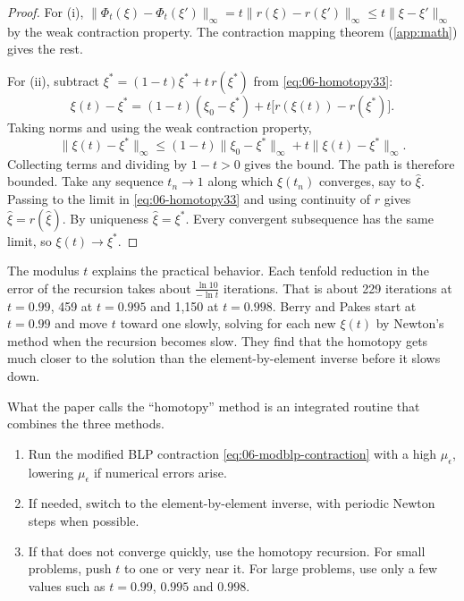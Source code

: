 \begin{proof}
For (i), $\lVert \Phi_t(\xi) - \Phi_t(\xi') \rVert_\infty = t \lVert r(\xi) - r(\xi') \rVert_\infty \le t \lVert \xi - \xi'
\rVert_\infty$ by the weak contraction property. The contraction mapping theorem (\cref{app:math}) gives the rest.

For (ii), subtract $\xi^* = (1 - t)\xi^* + t\, r(\xi^*)$ from \eqref{eq:06-homotopy33}:
\begin{equation*}
  \xi(t) - \xi^* = (1 - t)(\xi_0 - \xi^*) + t\bigl[r(\xi(t)) - r(\xi^*)\bigr] .
\end{equation*}
Taking norms and using the weak contraction property,
\begin{equation*}
  \lVert \xi(t) - \xi^* \rVert_\infty \le (1 - t)\lVert \xi_0 - \xi^* \rVert_\infty + t \lVert \xi(t) - \xi^* \rVert_\infty .
\end{equation*}
Collecting terms and dividing by $1 - t > 0$ gives the bound. The path is therefore bounded. Take any sequence $t_n \to 1$
along which $\xi(t_n)$ converges, say to $\hat\xi$. Passing to the limit in \eqref{eq:06-homotopy33} and using continuity of
$r$ gives $\hat\xi = r(\hat\xi)$. By uniqueness $\hat\xi = \xi^*$. Every convergent subsequence has the same limit, so
$\xi(t) \to \xi^*$.
\end{proof}

The modulus $t$ explains the practical behavior. Each tenfold reduction in the error of the recursion takes about
$\frac{\ln 10}{-\ln t}$ iterations. That is about 229 iterations at $t = 0.99$, 459 at $t = 0.995$ and 1,150 at
$t = 0.998$. Berry and Pakes start at $t = 0.99$ and move $t$ toward one slowly, solving for each new $\xi(t)$ by Newton's
method when the recursion becomes slow. They find that the homotopy gets much closer to the solution than the
element-by-element inverse before it slows down.

What the paper calls the ``homotopy'' method is an integrated routine that combines the three methods.
\begin{enumerate}
\item Run the modified BLP contraction \eqref{eq:06-modblp-contraction} with a high $\mu_\epsilon$, lowering
$\mu_\epsilon$ if numerical errors arise.
\item If needed, switch to the element-by-element inverse, with periodic Newton steps when possible.
\item If that does not converge quickly, use the homotopy recursion. For small problems, push $t$ to one or very near it.
For large problems, use only a few values such as $t = 0.99$, $0.995$ and $0.998$.
\end{enumerate}

